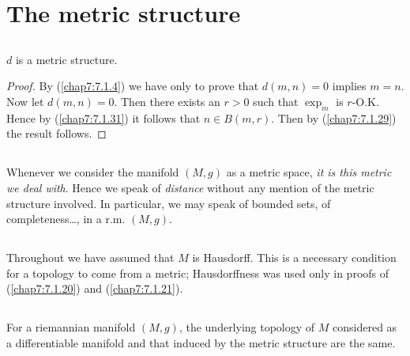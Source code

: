 \section{The metric structure}\label{chap7:chap7-sec2}

\subsection{}\label{chap7:7.2.1}

\begin{prop*}
$d$ is a metric structure.
\end{prop*}

\begin{proof}
By (\ref{chap7:7.1.4}) we have only to prove that $d(m,n)=0$ implies
$m=n$. Now let $d(m,n)=0$. Then there exists an $r>0$ such that
$\exp_{m}$ is $r$-O.K. Hence by (\ref{chap7:7.1.31}) it follows that
$n\in B(m,r)$. Then by (\ref{chap7:7.1.29}) the result follows.
\end{proof}

\setcounter{subsection}{1}
\subsection{}\label{chap7:7.2.2}\pageoriginale

Whenever we consider the manifold $(M,g)$ as a metric space, {\em it
  is this metric we deal with}. Hence we speak of {\em distance}
without any mention of the metric structure involved. In particular,
we may speak of bounded sets, of completeness\ldots, in a r.m.\@
$(M,g)$. 

\subsection{}\label{chap7:rem7.2.3}

\begin{remark*}
Throughout we have assumed that $M$ is Hausdorff. This is a necessary
condition for a topology to come from a metric; Hausdorffness was used
only in proofs of (\ref{chap7:7.1.20}) and (\ref{chap7:7.1.21}).
\end{remark*}

\setcounter{subsection}{3}

\subsection{}\label{chap7:7.2.4}

\begin{prop*}
For a riemannian manifold $(M,g)$, the underlying topology of $M$
considered as a differentiable manifold and that induced by the metric
structure are the same.
\end{prop*}

